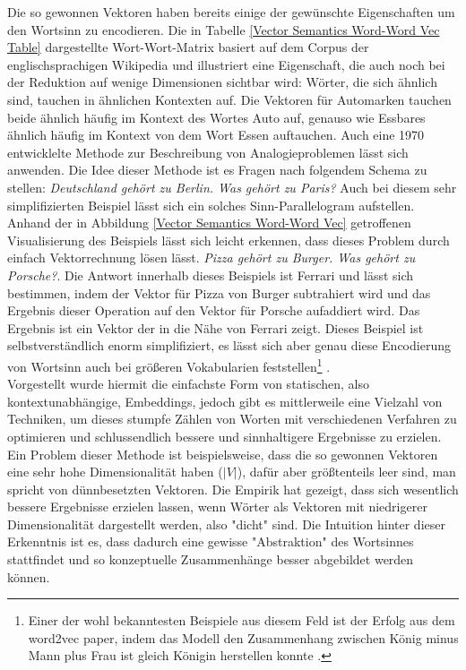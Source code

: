 Die so gewonnen Vektoren haben bereits einige der gewünschte Eigenschaften um den Wortsinn zu encodieren. Die in Tabelle \ref{Vector Semantics Word-Word Vec Table} dargestellte Wort-Wort-Matrix basiert auf dem Corpus der englischsprachigen Wikipedia und illustriert eine Eigenschaft, die auch noch bei der Reduktion auf wenige Dimensionen sichtbar wird: Wörter, die sich ähnlich sind, tauchen in ähnlichen Kontexten auf. Die Vektoren für Automarken tauchen beide ähnlich häufig im Kontext des Wortes Auto auf, genauso wie Essbares ähnlich häufig im Kontext von dem Wort Essen auftauchen. Auch eine 1970 entwicklelte Methode zur Beschreibung von Analogieproblemen lässt sich anwenden. \parencite[Vgl.][]{RUMELHART19731} Die Idee dieser Methode ist es Fragen nach folgendem Schema zu stellen: \emph{Deutschland gehört zu Berlin. Was gehört zu Paris?} Auch bei diesem sehr simplifizierten Beispiel lässt sich ein solches Sinn-Parallelogram aufstellen. Anhand der in Abbildung \ref{Vector Semantics Word-Word Vec} getroffenen Visualisierung des Beispiels lässt sich leicht erkennen, dass dieses Problem durch einfach Vektorrechnung lösen lässt. \emph{Pizza gehört zu Burger. Was gehört zu Porsche?}. Die Antwort innerhalb dieses Beispiels ist Ferrari und lässt sich bestimmen, indem der Vektor für Pizza von Burger subtrahiert wird und das Ergebnis dieser Operation auf den Vektor für Porsche aufaddiert wird. Das Ergebnis ist ein Vektor der in die Nähe von Ferrari zeigt. Dieses Beispiel ist selbstverständlich enorm simplifiziert, es lässt sich aber genau diese Encodierung von Wortsinn auch bei größeren Vokabularien feststellen\footnote{Einer der wohl bekanntesten Beispiele aus diesem Feld ist der Erfolg aus dem word2vec paper, indem das Modell den Zusammenhang zwischen König minus Mann plus Frau ist gleich Königin herstellen konnte \parencite[Vgl.][]{mikolov_chen_corrado_dean_2013}.} \parencite[Vgl.][S. 128f.]{jurafsky_martin_2020}. \\

Vorgestellt wurde hiermit die einfachste Form von statischen, also kontextunabhängige, Embeddings, jedoch gibt es mittlerweile eine Vielzahl von Techniken, um dieses stumpfe Zählen von Worten mit verschiedenen Verfahren zu optimieren und schlussendlich bessere und sinnhaltigere Ergebnisse zu erzielen. Ein Problem dieser Methode ist beispielsweise, dass die so gewonnen Vektoren eine sehr hohe Dimensionalität haben ($|V|$), dafür aber größtenteils leer sind, man spricht von dünnbesetzten Vektoren. Die Empirik hat gezeigt, dass sich wesentlich bessere Ergebnisse erzielen lassen, wenn Wörter als Vektoren mit niedrigerer Dimensionalität dargestellt werden, also "dicht" sind. Die Intuition hinter dieser Erkenntnis ist es, dass dadurch eine gewisse "Abstraktion" des Wortsinnes stattfindet und so konzeptuelle Zusammenhänge besser abgebildet werden können. \parencite[Vgl.][S. 113f.]{jurafsky_martin_2020} \\

